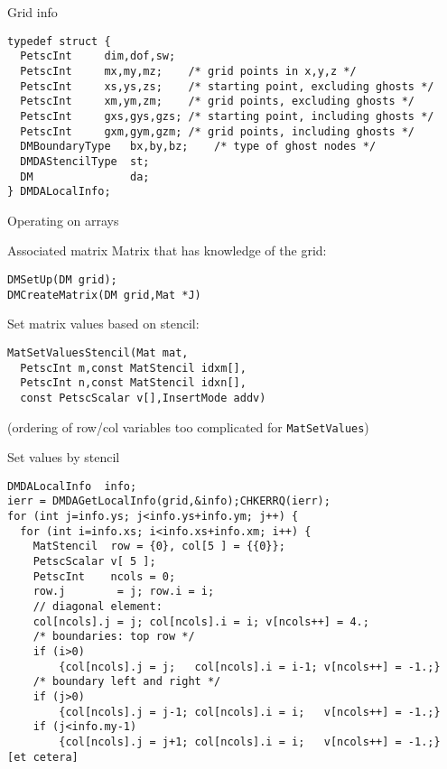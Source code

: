 \begin{numberedframe}{Grid info}
\begin{lstlisting}
typedef struct {
  PetscInt     dim,dof,sw;
  PetscInt     mx,my,mz;    /* grid points in x,y,z */
  PetscInt     xs,ys,zs;    /* starting point, excluding ghosts */
  PetscInt     xm,ym,zm;    /* grid points, excluding ghosts */
  PetscInt     gxs,gys,gzs; /* starting point, including ghosts */
  PetscInt     gxm,gym,gzm; /* grid points, including ghosts */
  DMBoundaryType   bx,by,bz;    /* type of ghost nodes */
  DMDAStencilType  st;
  DM               da;
} DMDALocalInfo;
\end{lstlisting}
\end{numberedframe}

\begin{numberedframe}{Operating on arrays}
\end{numberedframe}

\begin{numberedframe}{Associated matrix}
Matrix that has knowledge of the grid:
\begin{lstlisting}
DMSetUp(DM grid);
DMCreateMatrix(DM grid,Mat *J)
\end{lstlisting}
Set matrix values based on stencil:
\begin{lstlisting}
MatSetValuesStencil(Mat mat,
  PetscInt m,const MatStencil idxm[],
  PetscInt n,const MatStencil idxn[],
  const PetscScalar v[],InsertMode addv)
\end{lstlisting}
(ordering of row/col variables too complicated for \lstinline{MatSetValues})
\end{numberedframe}


\begin{numberedframe}{Set values by stencil}
\begin{lstlisting}
DMDALocalInfo  info;
ierr = DMDAGetLocalInfo(grid,&info);CHKERRQ(ierr);
for (int j=info.ys; j<info.ys+info.ym; j++) {
  for (int i=info.xs; i<info.xs+info.xm; i++) {
    MatStencil  row = {0}, col[5 ] = {{0}};
    PetscScalar v[ 5 ];
    PetscInt    ncols = 0;
    row.j        = j; row.i = i;
    // diagonal element:
    col[ncols].j = j; col[ncols].i = i; v[ncols++] = 4.;
    /* boundaries: top row */
    if (i>0)
        {col[ncols].j = j;   col[ncols].i = i-1; v[ncols++] = -1.;}
    /* boundary left and right */
    if (j>0)
        {col[ncols].j = j-1; col[ncols].i = i;   v[ncols++] = -1.;}
    if (j<info.my-1)
        {col[ncols].j = j+1; col[ncols].i = i;   v[ncols++] = -1.;}
[et cetera]    
\end{lstlisting}
\end{numberedframe}

